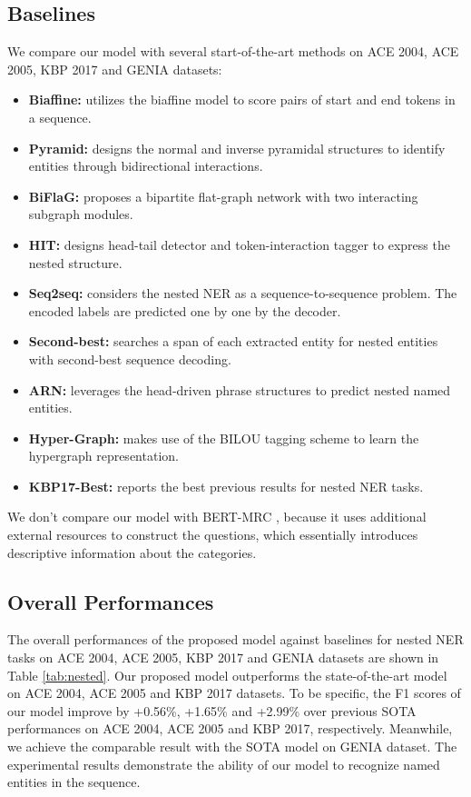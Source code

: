 \documentclass{article}
\begin{document}
\subsection{Baselines}
We compare our model with several start-of-the-art methods on ACE 2004, ACE 2005, KBP 2017 and GENIA datasets:
\begin{itemize}
    \item \textbf{Biaffine:} \citep{yu2020named} utilizes the biaffine model to score pairs of start and end tokens in a sequence.
    \item \textbf{Pyramid:} \citep{jue2020pyramid} designs the normal and inverse pyramidal structures to identify entities through bidirectional interactions.
    \item \textbf{BiFlaG:} \citep{luo-zhao-2020-bipartite} proposes a bipartite flat-graph network with two interacting subgraph modules.
    \item \textbf{HIT:} \citep{wang-etal-2020-hit} designs head-tail detector and token-interaction tagger to express the nested structure.
    \item \textbf{Seq2seq:} \citep{strakova2019neural} considers the nested NER as a sequence-to-sequence problem. The encoded labels are predicted one by one by the decoder.
    \item \textbf{Second-best:} \citep{shibuya2019nested} searches a span of each extracted entity for nested entities with second-best sequence decoding.
    \item \textbf{ARN:} \citep{lin2019sequence} leverages the head-driven phrase structures to predict nested named entities.
    \item \textbf{Hyper-Graph:} \citep{katiyar2018nested} makes use of the BILOU tagging scheme to learn the hypergraph representation.
    \item \textbf{KBP17-Best:} \citep{DBLP:conf/tac/JiPZNMMC17} reports the best previous results for nested NER tasks.
\end{itemize}

We don't compare our model with BERT-MRC \cite{li-etal-2020-unified}, because it uses additional external resources to construct the questions, which essentially introduces descriptive information about the categories. 

\subsection{Overall Performances}
The overall performances of the proposed model against baselines for nested NER tasks on ACE 2004, ACE 2005, KBP 2017 and GENIA datasets are shown in Table \ref{tab:nested}. 
Our proposed model outperforms the state-of-the-art model on ACE 2004, ACE 2005 and KBP 2017 datasets.
To be specific, the F1 scores of our model improve by +0.56\%, +1.65\% and +2.99\% over previous SOTA performances on ACE 2004, ACE 2005 and KBP 2017, respectively. Meanwhile, we achieve the comparable result with the SOTA model on GENIA dataset.
The experimental results demonstrate the ability of our model to recognize named entities in the sequence. 
\end{document}
